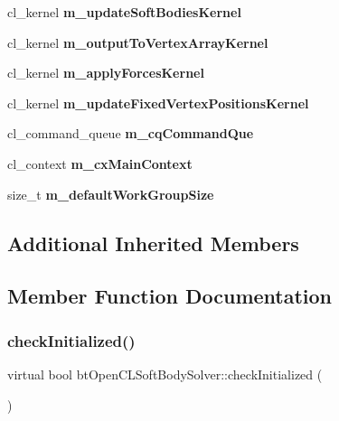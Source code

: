 \begin{DoxyCompactItemize}
$$cl\+\_\+kernel {\bfseries m\+\_\+update\+Soft\+Bodies\+Kernel}
\item 
\mbox{\label{classbtOpenCLSoftBodySolver_ad97303ca23d2f5158f73ae24f6da7dd4}} 
cl\+\_\+kernel {\bfseries m\+\_\+output\+To\+Vertex\+Array\+Kernel}
\item 
\mbox{\label{classbtOpenCLSoftBodySolver_a64c682791e65092cb41424ca4efc7522}} 
cl\+\_\+kernel {\bfseries m\+\_\+apply\+Forces\+Kernel}
\item 
\mbox{\label{classbtOpenCLSoftBodySolver_a9c1497e925c861f63de3f0eb4b0761dd}} 
cl\+\_\+kernel {\bfseries m\+\_\+update\+Fixed\+Vertex\+Positions\+Kernel}
\item 
\mbox{\label{classbtOpenCLSoftBodySolver_af16edee40e9ea1600566f01b5f19e912}} 
cl\+\_\+command\+\_\+queue {\bfseries m\+\_\+cq\+Command\+Que}
\item 
\mbox{\label{classbtOpenCLSoftBodySolver_a8d723432eb902de69c8994a090d5c5cc}} 
cl\+\_\+context {\bfseries m\+\_\+cx\+Main\+Context}
\item 
\mbox{\label{classbtOpenCLSoftBodySolver_a149077753133b4cffa4c710baf8147c5}} 
size\+\_\+t {\bfseries m\+\_\+default\+Work\+Group\+Size}
\end{DoxyCompactItemize}
\subsection*{Additional Inherited Members}


\subsection{Member Function Documentation}
\mbox{\label{classbtOpenCLSoftBodySolver_a246093f49e31b6c17fad98c7ac878860}} 
\subsubsection{\texorpdfstring{check\+Initialized()}{checkInitialized()}\hspace{0.1cm}{\footnotesize\ttfamily [1/2]}}
{\footnotesize\ttfamily virtual bool bt\+Open\+C\+L\+Soft\+Body\+Solver\+::check\+Initialized (\begin{DoxyParamCaption}{ }\end{DoxyParamCaption})\hspace{0.3cm}{\ttfamily [virtual]}}


